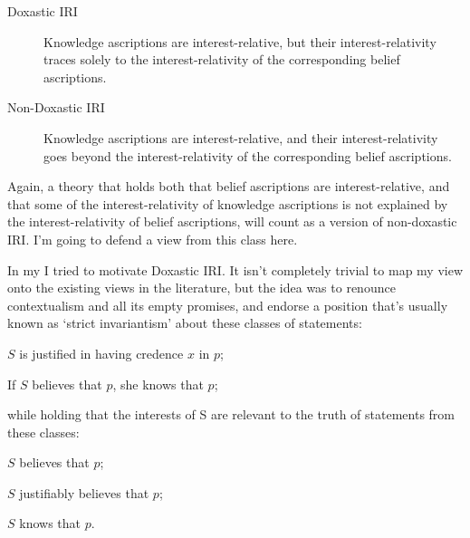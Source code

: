 \documentclass[11pt,oneside]{book}
\begin{document}
\begin{description}
\item[Doxastic IRI] Knowledge ascriptions are interest-relative, but their interest-rela\-tivity traces solely to the interest-relativity of the corresponding belief ascriptions.
\item[Non-Doxastic IRI] Knowledge ascriptions are interest-relative, and their inter\-est-relativity goes beyond the interest-relativity of the corresponding belief ascriptions.
\end{description}

\noindent Again, a theory that holds both that belief ascriptions are interest-relative, and that some of the interest-relativity of knowledge ascriptions is not explained by the interest-relativity of belief ascriptions, will count as a version of non-doxastic IRI. I'm going to defend a view from this class here.

In my \cite{Weatherson2005-WEACWD} I tried to motivate Doxastic IRI. It isn't completely trivial to map my view onto the existing views in the literature, but the idea was to renounce contextualism and all its empty promises, and endorse a position that's usually known as `strict invariantism' about these classes of statements:
\begin{itemize*}
\item $S$ is justified in having credence $x$ in $p$;
\item	If $S$ believes that $p$, she knows that $p$;
\end{itemize*}
\noindent while holding that the interests of S are relevant to the truth of statements from these classes:
\begin{itemize*}
\item $S$ believes that $p$;
\item $S$ justifiably believes that $p$;
\item $S$ knows that $p$.
\end{itemize*}
\end{document}
